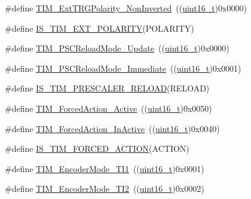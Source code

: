 \begin{DoxyCompactItemize}
\item 
\#define \hyperlink{group___t_i_m___external___trigger___polarity_ga63fe7c58c491d2a812d5621b71c2d0c5}{T\+I\+M\+\_\+\+Ext\+T\+R\+G\+Polarity\+\_\+\+Non\+Inverted}~((\hyperlink{_p_e___types_8h_a1f1825b69244eb3ad2c7165ddc99c956}{uint16\+\_\+t})0x0000)
\item 
\#define \hyperlink{group___t_i_m___external___trigger___polarity_ga489ea1fed28375dec49cf1b8dfac47ca}{I\+S\+\_\+\+T\+I\+M\+\_\+\+E\+X\+T\+\_\+\+P\+O\+L\+A\+R\+I\+TY}(P\+O\+L\+A\+R\+I\+TY)
\item 
\#define \hyperlink{group___t_i_m___prescaler___reload___mode_gad76dd05a3ae4e44e040e0e083bd460bf}{T\+I\+M\+\_\+\+P\+S\+C\+Reload\+Mode\+\_\+\+Update}~((\hyperlink{_p_e___types_8h_a1f1825b69244eb3ad2c7165ddc99c956}{uint16\+\_\+t})0x0000)
\item 
\#define \hyperlink{group___t_i_m___prescaler___reload___mode_ga9ba55481ccdcb64268b7b9f2095bfc17}{T\+I\+M\+\_\+\+P\+S\+C\+Reload\+Mode\+\_\+\+Immediate}~((\hyperlink{_p_e___types_8h_a1f1825b69244eb3ad2c7165ddc99c956}{uint16\+\_\+t})0x0001)
\item 
\#define \hyperlink{group___t_i_m___prescaler___reload___mode_ga156317fc6b2c1f6f2e1da9dfa555ecf4}{I\+S\+\_\+\+T\+I\+M\+\_\+\+P\+R\+E\+S\+C\+A\+L\+E\+R\+\_\+\+R\+E\+L\+O\+AD}(R\+E\+L\+O\+AD)
\item 
\#define \hyperlink{group___t_i_m___forced___action_ga19d3769825f1dfdbdbde3edb60310b99}{T\+I\+M\+\_\+\+Forced\+Action\+\_\+\+Active}~((\hyperlink{_p_e___types_8h_a1f1825b69244eb3ad2c7165ddc99c956}{uint16\+\_\+t})0x0050)
\item 
\#define \hyperlink{group___t_i_m___forced___action_ga79656f2193ec5e12a15d0ae5b025d273}{T\+I\+M\+\_\+\+Forced\+Action\+\_\+\+In\+Active}~((\hyperlink{_p_e___types_8h_a1f1825b69244eb3ad2c7165ddc99c956}{uint16\+\_\+t})0x0040)
\item 
\#define \hyperlink{group___t_i_m___forced___action_gaa2cb16f281d32c95ab974dc5157bfa63}{I\+S\+\_\+\+T\+I\+M\+\_\+\+F\+O\+R\+C\+E\+D\+\_\+\+A\+C\+T\+I\+ON}(A\+C\+T\+I\+ON)
\item 
\#define \hyperlink{group___t_i_m___encoder___mode_gabc63e3617a938382f87439ec58768b8e}{T\+I\+M\+\_\+\+Encoder\+Mode\+\_\+\+T\+I1}~((\hyperlink{_p_e___types_8h_a1f1825b69244eb3ad2c7165ddc99c956}{uint16\+\_\+t})0x0001)
\item 
\#define \hyperlink{group___t_i_m___encoder___mode_ga5627a2d5d47b7301c7dbb29d20ae00e3}{T\+I\+M\+\_\+\+Encoder\+Mode\+\_\+\+T\+I2}~((\hyperlink{_p_e___types_8h_a1f1825b69244eb3ad2c7165ddc99c956}{uint16\+\_\+t})0x0002)

\end{DoxyCompactItemize}
